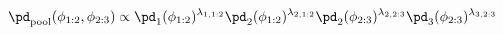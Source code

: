 \begin{equation}
  \pd_{\text{pool}} (\phi_{1:2}, \phi_{2:3}) \propto
  \pd_{1}(\phi_{1:2})^{\lambda_{1, 1:2}}
  \pd_{2}(\phi_{1:2})^{\lambda_{2, 1:2}}
  \pd_{2}(\phi_{2:3})^{\lambda_{2, 2:3}}
  \pd_{3}(\phi_{2:3})^{\lambda_{3, 2:3}}
  \label{eqn:pooling-via-marginalised-marginals}
\end{equation}